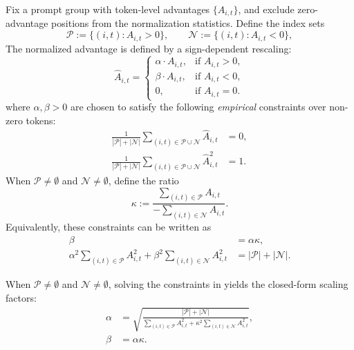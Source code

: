 \begin{definition}
\label{def:adaptive-norm}
Fix a prompt group with token-level advantages $\{A_{i,t}\}$, and exclude zero-advantage positions from the normalization statistics.
Define the index sets
\begin{equation*}
    \mathcal{P} := \{(i,t) : A_{i,t} > 0\},
    \qquad
    \mathcal{N} := \{(i,t) : A_{i,t} < 0\},
\end{equation*}
The normalized advantage is defined by a sign-dependent rescaling:
\begin{equation*}
    \hat{A}_{i,t}
    =
    \begin{cases}
        \alpha \cdot A_{i,t}, & \text{if } A_{i,t} > 0,
        \\
        \beta \cdot A_{i,t}, & \text{if } A_{i,t} < 0,
        \\
        0, & \text{if } A_{i,t} = 0.
    \end{cases}
\end{equation*}
where $\alpha,\beta>0$ are chosen to satisfy the following \emph{empirical} constraints over non-zero tokens:
\begin{align*}
    \frac{1}{|\mathcal{P}| + |\mathcal{N}|}\sum_{(i,t)\in\mathcal{P}\cup\mathcal{N}}\hat{A}_{i,t} &= 0,
    \\
    \frac{1}{|\mathcal{P}| + |\mathcal{N}|}\sum_{(i,t)\in\mathcal{P}\cup\mathcal{N}}\hat{A}_{i,t}^2 &= 1.
\end{align*}
When $\mathcal{P} \neq \emptyset$ and $\mathcal{N} \neq \emptyset$, define the ratio
\begin{equation*}
    \kappa := \frac{\sum_{(i,t)\in\mathcal{P}} A_{i,t}}{-\sum_{(i,t)\in\mathcal{N}} A_{i,t}}.
\end{equation*}
Equivalently, these constraints can be written as
\begin{equation*}
    \begin{aligned}
        \beta &= \alpha \kappa,
        \\
        \alpha^2 \sum_{(i,t)\in\mathcal{P}} A_{i,t}^2
        + \beta^2 \sum_{(i,t)\in\mathcal{N}} A_{i,t}^2
        &=
        |\mathcal{P}| + |\mathcal{N}|.
    \end{aligned}
\end{equation*}
\end{definition}

When $\mathcal{P} \neq \emptyset$ and $\mathcal{N} \neq \emptyset$, solving the constraints in  yields the
closed-form scaling factors:
\begin{equation}
    \label{eq:alpha-beta}
    \begin{aligned}
        \alpha
        &=
        \sqrt{
            \frac{|\mathcal{P}| + |\mathcal{N}|}{
                \sum_{(i,t)\in\mathcal{P}} A_{i,t}^2
                +
                \kappa^2 \sum_{(i,t)\in\mathcal{N}} A_{i,t}^2
            }
        },
        \\
        \beta
        &=
        \alpha \kappa.
    \end{aligned}
\end{equation}

